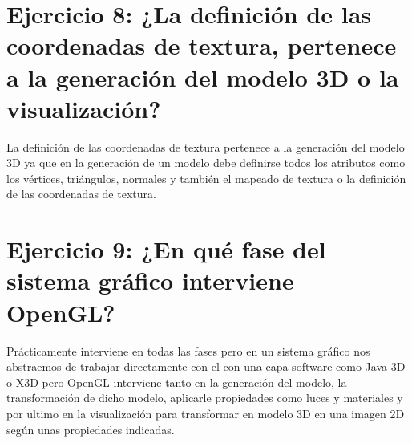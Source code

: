 \documentclass[10pt,a4paper,titlepage]{article}
\begin{document}
\section*{Ejercicio 8: ¿La definición de las coordenadas de textura, pertenece a la generación del modelo 3D o la visualización?}
La definición de las coordenadas de textura pertenece a la generación del modelo 3D ya que en la generación de un modelo debe definirse todos los atributos como los vértices, triángulos, normales y también el mapeado de textura o la definición de las coordenadas de textura.


\section*{Ejercicio 9: ¿En qué fase del sistema gráfico interviene OpenGL?}
Prácticamente interviene en todas las fases pero en un sistema gráfico nos abstraemos de trabajar directamente con el con una capa software como Java 3D o X3D pero OpenGL interviene tanto en la generación del modelo, la transformación de dicho modelo, aplicarle propiedades como luces y materiales y por ultimo en la visualización para transformar en modelo 3D en una imagen 2D según unas propiedades indicadas.
\end{document}
